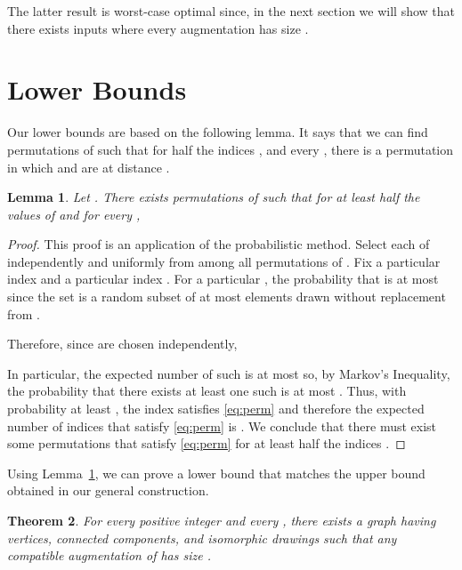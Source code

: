 \documentclass[11pt]{patmorin}
\newtheorem{theorem}{Theorem}[section]
\newtheorem{lemma}[theorem]{Lemma}
\begin{document}
The latter result is worst-case optimal since, in the next section we will show that there exists inputs where every augmentation has size .


\section{Lower Bounds}\label{section:Lower bound}

Our lower bounds are based on the following lemma. It says that we can find  permutations of  such that for half the indices , and every , there is a permutation in which  and  are at distance .

\begin{lemma}\label{lem:permutations}
Let .  There exists permutations  of  such that for at least half the values of  and for every ,

\end{lemma}

\begin{proof}
  This proof is an application of the probabilistic method.  Select each
  of  independently and uniformly from among
  all  permutations of .  Fix a particular index 
  and a particular index .  For a particular , the
  probability that  is at most 
  since the set
   is a random subset of at most  elements drawn without
  replacement from .

  Therefore, since  are chosen independently, 
  
  In particular, the expected number of such
   is at most  so, by Markov's
  Inequality, the probability that there exists at least one such 
  is at most .  Thus, with probability at least , the index 
  satisfies \eqref{eq:perm} and therefore the expected number of indices 
  that satisfy \eqref{eq:perm} is .  We conclude that there must exist
  some permutations  that satisfy \eqref{eq:perm}
  for at least half the indices .
\end{proof}

Using Lemma~\ref{lem:permutations}, we can prove a lower bound that matches the upper bound obtained in our general construction.

\begin{theorem}\label{thm:lower-bound}
  For every positive integer  and every ,
  there exists a graph  having  vertices,  connected
  components, and  isomorphic drawings  such that
  any compatible augmentation of  has size .
\end{theorem}
\end{document}
